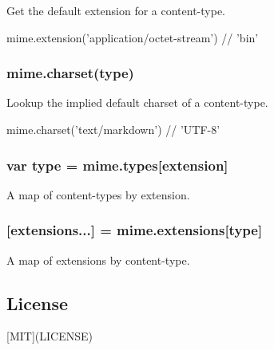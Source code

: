 Get the default extension for a content-\/type.


\begin{DoxyCode}
mime.extension('application/octet-stream') // 'bin'
\end{DoxyCode}


\subsubsection*{mime.\+charset(type)}

Lookup the implied default charset of a content-\/type.


\begin{DoxyCode}
mime.charset('text/markdown') // 'UTF-8'
\end{DoxyCode}


\subsubsection*{var type = mime.\+types\mbox{[}extension\mbox{]}}

A map of content-\/types by extension.

\subsubsection*{\mbox{[}extensions...\mbox{]} = mime.\+extensions\mbox{[}type\mbox{]}}

A map of extensions by content-\/type.

\subsection*{License}

\mbox{[}M\+IT\mbox{]}(L\+I\+C\+E\+N\+SE) 